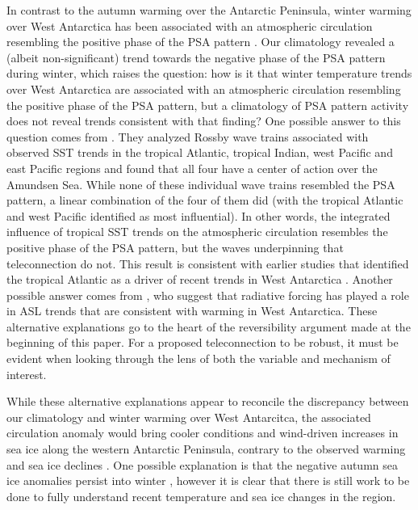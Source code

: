 In contrast to the autumn warming over the Antarctic Peninsula, winter warming over West Antarctica has been associated with an atmospheric circulation resembling the positive phase of the PSA pattern \citep{Ding2011}. Our climatology revealed a (albeit non-significant) trend towards the negative phase of the PSA pattern during winter, which raises the question: how is it that winter temperature trends over West Antarctica are associated with an atmospheric circulation resembling the positive phase of the PSA pattern, but a climatology of PSA pattern activity does not reveal trends consistent with that finding? One possible answer to this question comes from \citet{Li2015a}. They analyzed Rossby wave trains associated with observed SST trends in the tropical Atlantic, tropical Indian, west Pacific and east Pacific regions and found that all four have a center of action over the Amundsen Sea. While none of these individual wave trains resembled the PSA pattern, a linear combination of the four of them did (with the tropical Atlantic and west Pacific identified as most influential). In other words, the integrated influence of tropical SST trends on the atmospheric circulation resembles the positive phase of the PSA pattern, but the waves underpinning that teleconnection do not. This result is consistent with earlier studies that identified the tropical Atlantic as a driver of recent trends in West Antarctica \citep{Li2014,Simpkins2014}. Another possible answer comes from \citet{Fogt2015}, who suggest that radiative forcing has played a role in ASL trends that are consistent with warming in West Antarctica. These alternative explanations go to the heart of the reversibility argument made at the beginning of this paper. For a proposed teleconnection to be robust, it must be evident when looking through the lens of both the variable and mechanism of interest.

While these alternative explanations appear to reconcile the discrepancy between our climatology and winter warming over West Antarcitca, the associated circulation anomaly would bring cooler conditions and wind-driven increases in sea ice along the western Antarctic Peninsula, contrary to the observed warming and sea ice declines \citep{Clem2015}. One possible explanation is that the negative autumn sea ice anomalies persist into winter \citep{Ding2013}, however it is clear that there is still work to be done to fully understand recent temperature and sea ice changes in the region.


